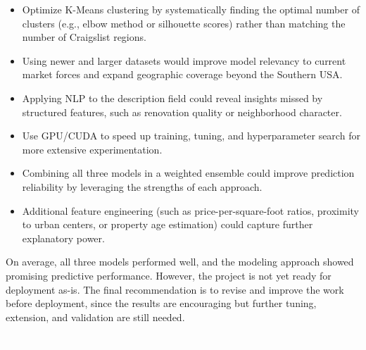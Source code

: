 \vspace{-12pt}
\begin{itemize}[itemsep=-9pt]
    \item Optimize K-Means clustering by systematically finding the optimal number of clusters (e.g., elbow method or silhouette scores) rather than matching the number of Craigslist regions.
    \item Using newer and larger datasets would improve model relevancy to current market forces and expand geographic coverage beyond the Southern USA.
    \item Applying NLP to the description field could reveal insights missed by structured features, such as renovation quality or neighborhood character.
    \item Use GPU/CUDA to speed up training, tuning, and hyperparameter search for more extensive experimentation.
    \item Combining all three models in a weighted ensemble could improve prediction reliability by leveraging the strengths of each approach.
    \item Additional feature engineering (such as price-per-square-foot ratios, proximity to urban centers, or property age estimation) could capture further explanatory power.
\end{itemize}

\vspace{-9pt}

\noindent
On average, all three models performed well, and the modeling approach showed promising predictive performance. However, the project is not yet ready for deployment as-is. The final recommendation is to revise and improve the work before deployment, since the results are encouraging but further tuning, extension, and validation are still needed.

\vspace{150pt}
\textcolor{white}{.}
